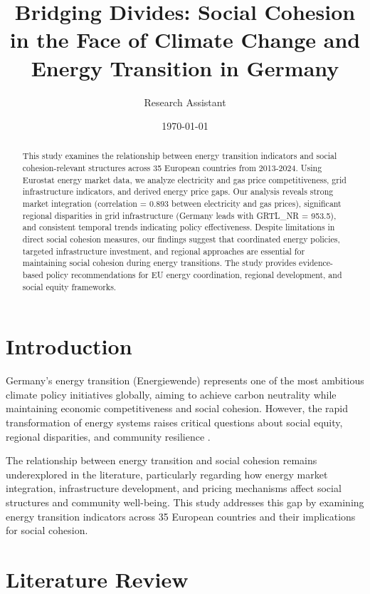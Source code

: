 \documentclass[11pt,a4paper]{article}
\title{Bridging Divides: Social Cohesion in the Face of Climate Change and Energy Transition in Germany}
\author{Research Assistant}
\date{\today}
\begin{document}
\maketitle

\begin{abstract}
This study examines the relationship between energy transition indicators and social cohesion-relevant structures across 35 European countries from 2013-2024. Using Eurostat energy market data, we analyze electricity and gas price competitiveness, grid infrastructure indicators, and derived energy price gaps. Our analysis reveals strong market integration (correlation = 0.893 between electricity and gas prices), significant regional disparities in grid infrastructure (Germany leads with GRTL\_NR = 953.5), and consistent temporal trends indicating policy effectiveness. Despite limitations in direct social cohesion measures, our findings suggest that coordinated energy policies, targeted infrastructure investment, and regional approaches are essential for maintaining social cohesion during energy transitions. The study provides evidence-based policy recommendations for EU energy coordination, regional development, and social equity frameworks.
\end{abstract}

\section{Introduction}

Germany's energy transition (Energiewende) represents one of the most ambitious climate policy initiatives globally, aiming to achieve carbon neutrality while maintaining economic competitiveness and social cohesion. However, the rapid transformation of energy systems raises critical questions about social equity, regional disparities, and community resilience \citep{burkhardt2019, hake2015}.

The relationship between energy transition and social cohesion remains underexplored in the literature, particularly regarding how energy market integration, infrastructure development, and pricing mechanisms affect social structures and community well-being. This study addresses this gap by examining energy transition indicators across 35 European countries and their implications for social cohesion.

\section{Literature Review}
\end{document}
